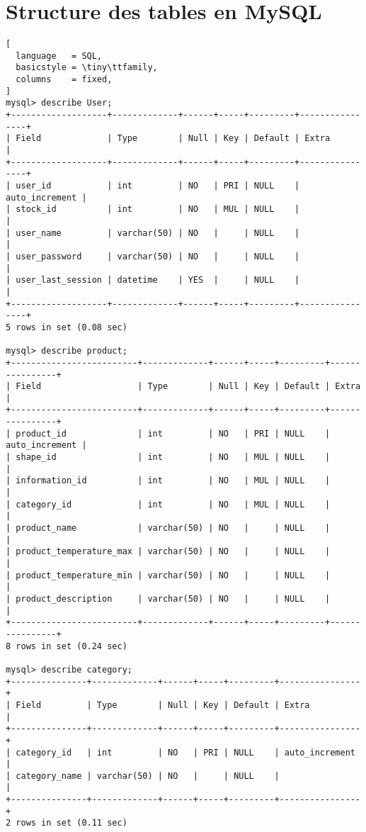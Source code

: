 \chapter{Structure des tables en MySQL}
\begin{landscape}
\begin{lstlisting}[
  language   = SQL,
  basicstyle = \tiny\ttfamily,
  columns    = fixed,
]
mysql> describe User;
+-------------------+-------------+------+-----+---------+----------------+
| Field             | Type        | Null | Key | Default | Extra          |
+-------------------+-------------+------+-----+---------+----------------+
| user_id           | int         | NO   | PRI | NULL    | auto_increment |
| stock_id          | int         | NO   | MUL | NULL    |                |
| user_name         | varchar(50) | NO   |     | NULL    |                |
| user_password     | varchar(50) | NO   |     | NULL    |                |
| user_last_session | datetime    | YES  |     | NULL    |                |
+-------------------+-------------+------+-----+---------+----------------+
5 rows in set (0.08 sec)

mysql> describe product;
+-------------------------+-------------+------+-----+---------+----------------+
| Field                   | Type        | Null | Key | Default | Extra          |
+-------------------------+-------------+------+-----+---------+----------------+
| product_id              | int         | NO   | PRI | NULL    | auto_increment |
| shape_id                | int         | NO   | MUL | NULL    |                |
| information_id          | int         | NO   | MUL | NULL    |                |
| category_id             | int         | NO   | MUL | NULL    |                |
| product_name            | varchar(50) | NO   |     | NULL    |                |
| product_temperature_max | varchar(50) | NO   |     | NULL    |                |
| product_temperature_min | varchar(50) | NO   |     | NULL    |                |
| product_description     | varchar(50) | NO   |     | NULL    |                |
+-------------------------+-------------+------+-----+---------+----------------+
8 rows in set (0.24 sec)

mysql> describe category;
+---------------+-------------+------+-----+---------+----------------+
| Field         | Type        | Null | Key | Default | Extra          |
+---------------+-------------+------+-----+---------+----------------+
| category_id   | int         | NO   | PRI | NULL    | auto_increment |
| category_name | varchar(50) | NO   |     | NULL    |                |
+---------------+-------------+------+-----+---------+----------------+
2 rows in set (0.11 sec)


\end{lstlisting}
\end{landscape}
